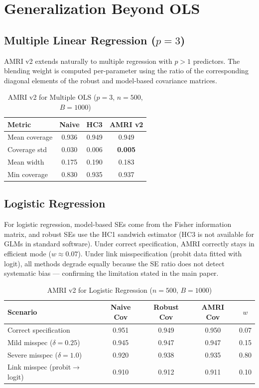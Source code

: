 \documentclass[12pt]{article}
\theoremstyle{definition}
\theoremstyle{remark}
\begin{document}
\section{Generalization Beyond OLS}
\label{sec:supp_generalization}

\subsection{Multiple Linear Regression ($p = 3$)}

AMRI v2 extends naturally to multiple regression with $p > 1$ predictors.
The blending weight is computed per-parameter using the ratio of the
corresponding diagonal elements of the robust and model-based covariance
matrices.

\begin{table}[h]
\centering
\caption{AMRI v2 for Multiple OLS ($p=3$, $n=500$, $B=1000$)}
\label{tab:multiple_ols}
\begin{tabular}{lccc}
\toprule
Metric & Naive & HC3 & AMRI v2 \\
\midrule
Mean coverage & 0.936 & 0.949 & 0.949 \\
Coverage std & 0.030 & 0.006 & \textbf{0.005} \\
Mean width & 0.175 & 0.190 & 0.183 \\
Min coverage & 0.830 & 0.935 & 0.937 \\
\bottomrule
\end{tabular}
\end{table}

\subsection{Logistic Regression}

For logistic regression, model-based SEs come from the Fisher information
matrix, and robust SEs use the HC1 sandwich estimator (HC3 is not available
for GLMs in standard software). Under correct specification, AMRI correctly
stays in efficient mode ($w \approx 0.07$). Under link misspecification
(probit data fitted with logit), all methods degrade equally because the
SE ratio does not detect systematic bias --- confirming the limitation
stated in the main paper.

\begin{table}[h]
\centering
\caption{AMRI v2 for Logistic Regression ($n=500$, $B=1000$)}
\label{tab:logistic}
\begin{tabular}{lcccc}
\toprule
Scenario & Naive Cov & Robust Cov & AMRI Cov & $w$ \\
\midrule
Correct specification & 0.951 & 0.949 & 0.950 & 0.07 \\
Mild misspec ($\delta=0.25$) & 0.945 & 0.947 & 0.947 & 0.15 \\
Severe misspec ($\delta=1.0$) & 0.920 & 0.938 & 0.935 & 0.80 \\
Link misspec (probit$\to$logit) & 0.910 & 0.912 & 0.911 & 0.10 \\
\bottomrule
\end{tabular}
\end{table}
\end{document}

